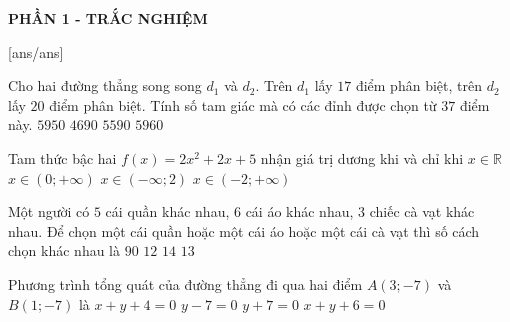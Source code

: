 

\begin{center}
	\textbf{PHẦN 1 - TRẮC NGHIỆM}
\end{center}
[ans/ans]
\begin{ex}%
	Cho hai đường thẳng song song $d_1$ và $d_2$. Trên $d_1$ lấy $17$ điểm phân biệt, trên $d_2$ lấy $20$ điểm phân biệt. Tính số tam giác mà có các đỉnh được chọn từ $37$ điểm này.
	\choice
	{\True $5950$}
	{$4690$}
	{$5590$}
	{$5960 $}
\end{ex}

\begin{ex}%
	Tam thức bậc hai $f(x)=2x^2+2x+5$ nhận giá trị dương khi và chỉ khi
	\choice
	{\True $x \in \mathbb{R}$}
	{$x \in(0 ;+\infty)$}
	{$x \in(-\infty ; 2)$}
	{$x \in(-2 ;+\infty)$}
\end{ex}

\begin{ex}%
	 Một người có $5$ cái quần khác nhau, $6$ cái áo khác nhau, $3$ chiếc cà vạt khác nhau. Để chọn một cái quần hoặc một cái áo hoặc một cái cà vạt thì số cách chọn khác nhau là
	\choice
	{$90$}
	{$12$}
	{\True $14$}
	{$13$}
\end{ex}

\begin{ex}%
   Phương trình tổng quát của đường thẳng đi qua hai điểm $A(3 ;-7)$ và $B(1 ;-7)$ là
	\choice
	{$x+y+4=0$}
	{$y-7=0$}
	{\True $y+7=0$}
	{$x+y+6=0$}
\end{ex}

